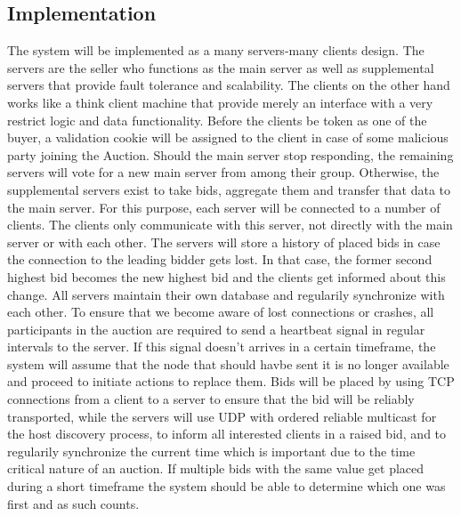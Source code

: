 \subsection{Implementation}
The system will be implemented as a many servers-many clients design. The servers are the seller who functions as the main server as well as supplemental servers that provide fault tolerance and scalability. The clients on the other hand works like a think client machine that provide merely an interface with a very restrict logic and data functionality. Before the clients be token as one of the buyer, a validation cookie will be assigned to the client in case of some malicious party joining the Auction. Should the main server stop responding, the remaining servers will vote for a new main server from among their group. Otherwise, the supplemental servers exist to take bids, aggregate them and transfer that data to the main server. For this purpose, each server will be connected to a number of clients. The clients only communicate with this server, not directly with the main server or with each other. The servers will store a history of placed bids in case the connection to the leading bidder gets lost. In that case, the former second highest bid becomes the new highest bid and the clients get informed about this change. All servers maintain their own database and regularily synchronize with each other. To ensure that we become aware of lost connections or crashes, all participants in the auction are required to send a heartbeat signal in regular intervals to the server. If this signal doesn't arrives in a certain timeframe, the system will assume that the node that should havbe sent it is no longer available and proceed to initiate actions to replace them. Bids will be placed by using TCP connections from a client to a server to ensure that the bid will be reliably transported, while the servers will use UDP with ordered reliable multicast for the host discovery process, to inform all interested clients in a raised bid, and to regularily synchronize the current time which is important due to the time critical nature of an auction. If multiple bids with the same value get placed during a short timeframe the system should be able to determine which one was first and as such counts.

